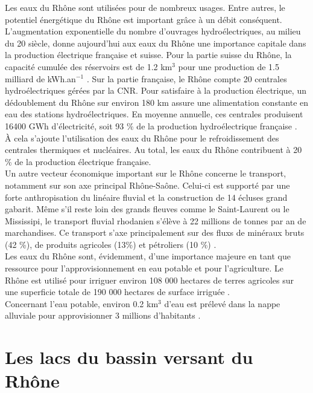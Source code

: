 Les eaux du Rhône sont utilisées pour de nombreux usages. Entre autres, le potentiel énergétique du Rhône est important grâce à un débit conséquent. L'augmentation exponentielle du nombre d'ouvrages hydroélectriques, au milieu du 20\ieme{} siècle, donne aujourd'hui aux eaux du Rhône une importance capitale dans la production électrique française et suisse. Pour la partie suisse du Rhône, la capacité cumulée des réservoirs est de 1.2 km$^{3}$ pour une production de 1.5 milliard de kWh.an$^{-1}$ \citep{olivier2009}. Sur la partie française, le Rhône compte 20 centrales hydroélectriques gérées par la CNR. Pour satisfaire à la production électrique, un dédoublement du Rhône sur environ 180 km assure une alimentation constante en eau des stations hydroélectriques. En moyenne annuelle, ces centrales produisent 16400 GWh d'électricité, soit 93 \% de la production hydroélectrique française \citep{rhone2008}. \\
À cela s'ajoute l'utilisation des eaux du Rhône pour le refroidissement des centrales thermiques et nucléaires. Au total, les eaux du Rhône contribuent à 20 \% de la production électrique française. \\

Un autre vecteur économique important sur le Rhône concerne le transport, notamment sur son axe principal Rhône-Saône. Celui-ci est supporté par une forte anthropisation du linéaire fluvial et la construction de 14 écluses grand gabarit. Même s'il reste loin des grands fleuves comme le Saint-Laurent ou le Mississipi, le transport fluvial rhodanien s'élève à 22 millions de tonnes par an de marchandises. Ce transport s'axe principalement sur des fluxs de minéraux bruts (42 \%), de produits agricoles (13\%) et pétroliers (10 \%) \citep{rhone2008}. \\

Les eaux du Rhône sont, évidemment, d'une importance majeure en tant que ressource pour l'approvisionnement en eau potable et pour l'agriculture. Le Rhône est utilisé pour irriguer environ 108 000 hectares de terres agricoles sur une superficie totale de 190 000 hectares de surface irriguée \citep{rhone2008}.\\
Concernant l'eau potable, environ 0.2 km$^{3}$ d'eau est prélevé dans la nappe alluviale pour approvisionner 3 millions d'habitants \citep{olivier2009}.

\section{{\selectfont Les lacs du bassin versant du Rhône}}

